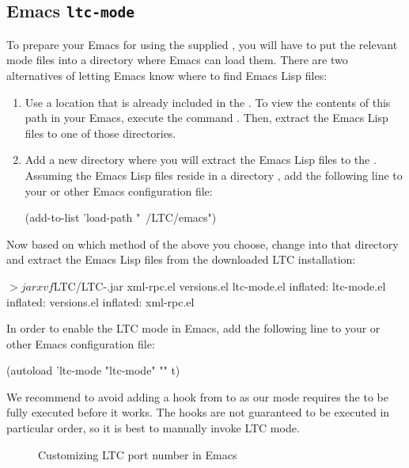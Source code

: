 \subsection{Emacs \texttt{ltc-mode}} \label{sec:config-emacs}

To prepare your Emacs for using the supplied , you will have to put the relevant mode files into a directory where Emacs can load them. There are two alternatives of letting Emacs know where to find Emacs Lisp files:
\begin{enumerate}
\item Use a location that is already included in the . To view the contents of this path in your Emacs, execute the command . Then, extract the Emacs Lisp files to one of those directories.
\item Add a new directory where you will extract the Emacs Lisp files to the . Assuming the Emacs Lisp files reside in a directory , add the following line to your  or other Emacs configuration file:
  \begin{CodeVerbatim}
(add-to-list 'load-path "~/LTC/emacs")
  \end{CodeVerbatim}
\end{enumerate}

Now based on which method of the above you choose, change into that directory and extract the Emacs Lisp files from the downloaded LTC installation:
\begin{CodeVerbatim}[commandchars=\\\{\}]
$> jar xvf $LTC/LTC-\version.jar xml-rpc.el versions.el ltc-mode.el
 inflated: ltc-mode.el
 inflated: versions.el
 inflated: xml-rpc.el
\end{CodeVerbatim}

In order to enable the LTC mode in Emacs, add the following line to your  or other Emacs configuration file:

\begin{CodeVerbatim}
(autoload 'ltc-mode "ltc-mode" "" t)
\end{CodeVerbatim}

We recommend to avoid adding a hook from  to  as our mode requires the  to be fully executed before it works. The hooks are not guaranteed to be executed in particular order, so it is best to manually invoke LTC mode.

\begin{figure}[t]
\centering
{}
\caption{Customizing LTC port number in Emacs} \label{fig:emacs-port}
\end{figure}


